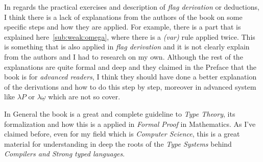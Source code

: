 \documentclass[12pt, a4paper]{article}
\begin{document}
In regards the practical exercises and description of \textit{flag derivation} or deductions, I think there is a lack of explanations from the authors of the book on some specific steps and how they are applied.
For example, there is a part that is explained here~\ref{sub:weak:omega}, where there is a \textit{(var)} rule applied twice. This is something that is also applied in \textit{flag derivation}
and it is not clearly explain from the authors and I had to research on my own. Although the rest of the explanations are quite formal and deep and they claimed in the Preface that the book is for \textit{advanced readers}, 
I think they should have done a better explanation of the derivations and how to do this step by step, moreover in advanced system like $\lambda P$ or $\lambda \underline\omega$ which are not so cover. 

In General the book is a great and complete guideline to \textit{Type Theory}, its formalization and how this is a applied in \textit{Formal Proof} in Mathematics. As I've claimed before, even for my field which is \textit{Computer Science}, 
this is a great material for understanding in deep the roots of the \textit{Type Systems} behind \textit{Compilers and Strong typed languages}.

\newpage


\end{document}
